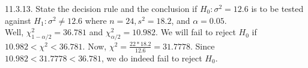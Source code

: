 \documentclass[12pt]{article}
\begin{document}
11.3.13. State the decision rule and the conclusion if $H_0:\sigma^2=12.6$ is to be tested against $H_1:\sigma^2\neq12.6$ where $n=24, s^2=18.2$, and $\alpha=0.05$.\\
Well, $\chi^2_{1-\alpha/2}=36.781$ and $\chi^2_{\alpha/2}=10.982$. We will fail to reject $H_0$ if $10.982<\chi^2<36.781$. Now, $\chi^2=\frac{22*18.2}{12.6}=31.7778$. Since $10.982<31.7778<36.781$, we do indeed fail to reject $H_0$.
\end{document}
